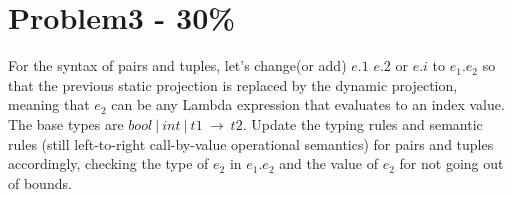 \documentclass{article}
\begin{document}
\section*{Problem3 - 30\%}

For the syntax of pairs and tuples, let's change(or add) $e.1$ $e.2$ or $e.i$ to $e_1.e_2$ so that the previous static projection is replaced by the dynamic projection, meaning that $e_2$ can be any Lambda expression that evaluates to an
index value. 
The base types are $bool\ |\ int\ |\ t1\ \rightarrow\ t2$. Update the typing rules and semantic rules (still left-to-right call-by-value operational semantics)
for pairs and tuples accordingly, checking the type of $e_2$ in $e_1.e_2$ and the value of $e_2$ for not going out of bounds.
\end{document}
